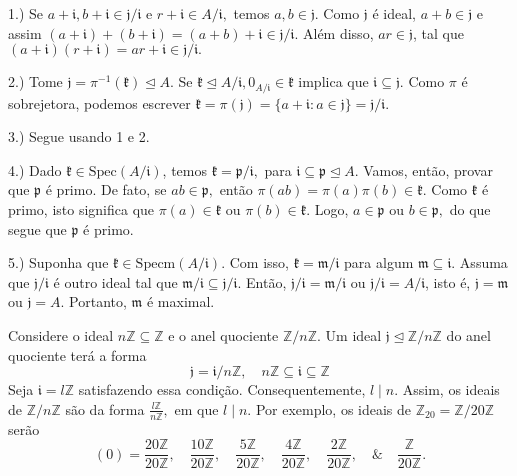 \documentclass[AlgebraII/algebraII_notes.tex]{subfiles}
\begin{document}
\begin{proof*}
	1.) Se \(a+\mathfrak{i}, b+\mathfrak{i}\in \mathfrak{j}/\mathfrak{i}\) e \(r+\mathfrak{i}\in A/\mathfrak{i},\) temos
	\(a, b\in \mathfrak{j}.\) Como \(\mathfrak{j}\) é ideal, \(a+b\in \mathfrak{j}\) e assim \((a+\mathfrak{i}) + (b+\mathfrak{i}) = (a+b)
	+\mathfrak{i}\in \mathfrak{j}/\mathfrak{i}.\) Além disso, \(ar\in \mathfrak{j}\), tal que \((a+\mathfrak{i})(r+\mathfrak{i})=ar + \mathfrak{i}\in
	\mathfrak{j}/\mathfrak{i}.\)

	2.) Tome \(\mathfrak{j} = \pi^{-1}(\mathfrak{k})\trianglelefteq{A}.\) Se \(\mathfrak{k}\trianglelefteq{A/\mathfrak{i}}, 0_{A/\mathfrak{i}}\in \mathfrak{k}\)
	implica que \(\mathfrak{i}\subseteq{\mathfrak{j}}.\) Como \(\pi \) é sobrejetora, podemos escrever
	\(\mathfrak{k} = \pi(\mathfrak{j}) = \{a+\mathfrak{i}: a\in \mathfrak{j}\} = \mathfrak{j}/\mathfrak{i}.\)

	3.) Segue usando 1 e 2.

	4.) Dado \(\mathfrak{k}\in \mathrm{Spec}(A/\mathfrak{i})\), temos \(\mathfrak{k} = \mathfrak{p}/\mathfrak{i},\)
	para \(\mathfrak{i}\subseteq{\mathfrak{p}}\trianglelefteq{A}.\) Vamos, então, provar que \(\mathfrak{p}\) é primo.
	De fato, se \(ab\in \mathfrak{p},\) então \(\pi (ab)=\pi(a)\pi(b)\in \mathfrak{k}\). Como \(\mathfrak{k}\) é primo,
	isto significa que \(\pi(a)\in \mathfrak{k}\) ou \(\pi(b)\in \mathfrak{k}\). Logo, \(a\in \mathfrak{p}\) ou \(b\in \mathfrak{p},\) do que
	segue que \(\mathfrak{p}\) é primo.

	5.) Suponha que \(\mathfrak{k}\in \mathrm{Specm}(A/\mathfrak{i}).\) Com isso, \(\mathfrak{k} = \mathfrak{m}/\mathfrak{i}\)
	para algum \(\mathfrak{m}\subseteq{\mathfrak{i}}.\) Assuma que \(\mathfrak{j}/\mathfrak{i}\) é outro ideal tal que \(\mathfrak{m}/\mathfrak{i}\subseteq{\mathfrak{j}/\mathfrak{i}}.\)
	Então, \(\mathfrak{j}/\mathfrak{i} = \mathfrak{m}/\mathfrak{i}\) ou \(\mathfrak{j}/\mathfrak{i} = A/\mathfrak{i}\), isto é,
	\(\mathfrak{j} = \mathfrak{m}\) ou \(\mathfrak{j} = A\). Portanto, \(\mathfrak{m} \) é maximal. \qedsymbol
\end{proof*}
\begin{example}
	Considere o ideal \(n \mathbb{Z}\subseteq \mathbb{Z}\) e o anel quociente \(\mathbb{Z}/n \mathbb{Z}.\)
	Um ideal \(\mathfrak{j}\trianglelefteq \mathbb{Z}/n \mathbb{Z}\) do anel quociente terá a forma
	\[
		\mathfrak{j} = \mathfrak{i}/n \mathbb{Z},\quad n \mathbb{Z}\subseteq \mathfrak{i}\subseteq \mathbb{Z}
	\]
	Seja \(\mathfrak{i} = l \mathbb{Z}\) satisfazendo essa condição. Consequentemente, \(l\mid n\). Assim, os ideais de
	\(\mathbb{Z}/n \mathbb{Z}\) são da forma \(\frac{l \mathbb{Z}}{n \mathbb{Z}},\) em que \(l\mid n\). Por exemplo, os ideais
	de \(\mathbb{Z}_{20} = \mathbb{Z}/20 \mathbb{Z}\) serão
	\[
		(0) = \frac{20 \mathbb{Z}}{20 \mathbb{Z}},\quad \frac{10 \mathbb{Z}}{20 \mathbb{Z}}, \quad \frac{5 \mathbb{Z}}{20 \mathbb{Z}},\quad \frac{4 \mathbb{Z}}{20 \mathbb{Z}}, \quad \frac{2 \mathbb{Z}}{20 \mathbb{Z}}, \quad\&\quad \frac{\mathbb{Z}}{20 \mathbb{Z}}.
	\]
\end{example}
\end{document}
